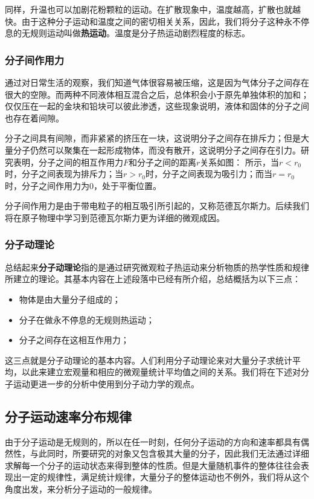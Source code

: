 同样，升温也可以加剧花粉颗粒的运动。在扩散现象中，温度越高，扩散也就越快。由于这种分子运动和温度之间的密切相关关系，因此，我们将分子这种永不停息的无规则运动叫做\textbf{热运动}。温度是分子热运动剧烈程度的标志。

\subsubsection{分子间作用力}
通过对日常生活的观察，我们知道气体很容易被压缩，这是因为气体分子之间存在很大的空隙。而两种不同液体相互混合之后，总体积会小于原先单独体积的加和；仅仅压在一起的金块和铅块可以彼此渗透，这些现象说明，液体和固体的分子之间也存在着间隙。

分子之间具有间隙，而非紧紧的挤压在一块，这说明分子之间存在排斥力；但是大量分子仍然可以聚集在一起形成物体，而没有散开，这说明分子之间存在引力。研究表明，分子之间的相互作用力$F$和分子之间的距离$r$关系如图：
所示，当$r<r_0$时，分子之间表现为排斥力；当$r>r_0$时，分子之间表现为吸引力；而当$r=r_0$时，分子之间作用力为$0$，处于平衡位置。

分子间作用力是由于带电粒子的相互吸引所引起的，又称范德瓦尔斯力。后续我们将在原子物理中学习到范德瓦尔斯力更为详细的微观成因。
\subsubsection{分子动理论}
总结起来\textbf{分子动理论}指的是通过研究微观粒子热运动来分析物质的热学性质和规律所建立的理论。其基本内容在上述段落中已经有所介绍，总结概括为以下三点：
\begin{itemize}
\item 物体是由大量分子组成的；
\item  分子在做永不停息的无规则热运动；
\item 分子之间存在这相互作用力；
\end{itemize}这三点就是分子动理论的基本内容。人们利用分子动理论来对大量分子求统计平均，以此来建立宏观量和相应的微观量统计平均值之间的关系。我们将在下述对分子运动更进一步的分析中使用到分子动力学的观点。

\subsection{分子运动速率分布规律}
由于分子运动是无规则的，所以在任一时刻，任何分子运动的方向和速率都具有偶然性，与此同时，所要研究的对象又包含极其大量的分子，因此我们无法通过详细求解每一个分子的运动状态来得到整体的性质。但是大量随机事件的整体往往会表现出一定的规律性，满足统计规律，大量分子的整体运动也不例外，我们将从这个角度出发，来分析分子运动的一般规律。

